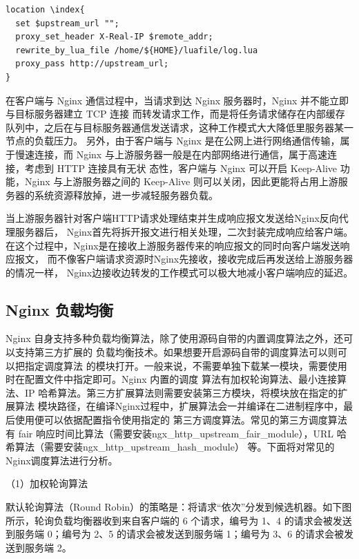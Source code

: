 \newpage

\noindent \begin{lstlisting}[caption={Nginx 反向代理默认配置}]
location \index{
  set $upstream_url "";
  proxy_set_header X-Real-IP $remote_addr;
  rewrite_by_lua_file /home/${HOME}/luafile/log.lua
  proxy_pass http://upstream_url;
}
\end{lstlisting}

在客户端与 Nginx 通信过程中，当请求到达 Nginx 服务器时，Nginx 并不能立即与目标服务器建立 TCP 连接
而转发请求工作，而是将任务请求储存在内部缓存队列中，之后在与目标服务器通信发送请求，这种工作模式大大降低里服务器某一节点的负载压力。
另外，由于客户端与 Nginx 是在公网上进行网络通信传输，属于慢速连接，而 Nginx 与上游服务器一般是在内部网络进行通信，属于高速连接，考虑到 HTTP 连接具有无状
态性，客户端与 Nginx 可以开启 Keep-Alive 功能，Nginx 与上游服务器之间的 Keep-Alive
则可以关闭，因此更能将占用上游服务器的系统资源释放掉，进一步减轻服务器负载。

当上游服务器针对客户端HTTP请求处理结束并生成响应报文发送给Nginx反向代理服务器后，
Nginx首先将拆开报文进行相关处理，二次封装完成响应给客户端。
在这个过程中，Nginx是在接收上游服务器传来的响应报文的同时向客户端发送响应报文，
而不像客户端请求资源时Nginx先接收，接收完成后再发送给上游服务器的情况一样，
Nginx边接收边转发的工作模式可以极大地减小客户端响应的延迟\cite{邓仲举2012高可靠性集群部署的设计与实现}。

\subsection{Nginx 负载均衡}

Nginx 自身支持多种负载均衡算法，除了使用源码自带的内置调度算法之外，还可以支持第三方扩展的
负载均衡技术\cite{sufiev2016dynamic}。如果想要开启源码自带的调度算法可以则可以把指定调度算法
的模块打开。一般来说，不需要单独下载某一模块，需要使用时在配置文件中指定即可。Nginx 内置的调度
算法有加权轮询算法、最小连接算法、IP 哈希算法。第三方扩展算法则需要安装第三方模块，将模块放在指定的扩展算法
模块路径，在编译Nginx过程中，扩展算法会一并编译在二进制程序中，最后使用便可以依据配置指令使用指定的
第三方调度算法。常见的第三方调度算法有 fair 响应时间比算法（需要安装ngx\_http\_upstream\_fair\_module），URL 哈希算法（需要安装ngx\_http\_upstream\_hash\_module）
等。下面将对常见的Nginx调度算法进行分析。

（1）加权轮询算法

默认轮询算法（Round Robin）的策略是：将请求“依次”分发到候选机器。如下图所示，轮询负载均衡器收到来自客户端的 6 个请求，编号为 1、4 的请求会被发送到服务端 0；编号为 2、5 的请求会被发送到服务端 1；编号为 3、6 的请求会被发送到服务端 2。

